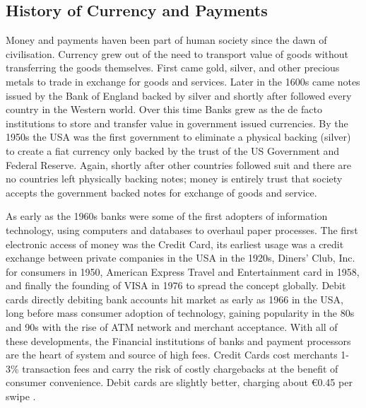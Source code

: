 \documentclass[12pt]{article} %
\begin{document}
\subsection{History of Currency and Payments}
Money and payments haven been part of human society since the dawn of civilisation. Currency grew out of the need to transport value of goods without transferring the goods themselves. First came gold, silver, and other precious metals to trade in exchange for goods and services. Later in the 1600s came notes issued by the Bank of England backed by silver and shortly after followed every country in the Western world. Over this time Banks grew as the de facto institutions to store and transfer value in government issued currencies. By the 1950s the USA was the first government to eliminate a physical backing (silver) to create a fiat currency only backed by the trust of the US Government and Federal Reserve. Again, shortly after other countries followed suit and there are no countries left physically backing notes; money is entirely trust that society accepts the government backed notes for exchange of goods and service.

As early as the 1960s banks were some of the first adopters of information technology, using computers and databases to overhaul paper processes. The first electronic access of money was the Credit Card, its earliest usage was a credit exchange between private companies in the USA in the 1920s, Diners’ Club, Inc. for consumers in 1950, American Express Travel and Entertainment card in 1958, and finally the founding of VISA in 1976 to spread the concept globally\cite{britannica2016creditcard}. Debit cards directly debiting bank accounts hit market as early as 1966 in the USA, long before mass consumer adoption of technology, gaining popularity in the 80s and 90s with the rise of ATM network and merchant acceptance\cite{collins2011debitcard}. With all of these developments, the Financial institutions of banks and payment processors are the heart of system and source of high fees. Credit Cards cost  merchants 1-3\% transaction fees and carry the risk of costly chargebacks at the benefit of consumer convenience. Debit cards are slightly better, charging about \euro0.45 per swipe \cite{kaarmann2014government}. 
\end{document}
